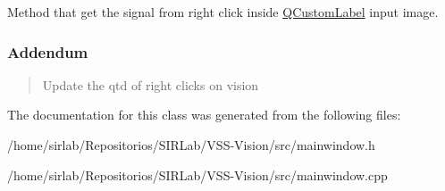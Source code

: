 Method that get the signal from right click inside \hyperlink{classQCustomLabel}{Q\-Custom\-Label} input image. 

\subsubsection*{Addendum }\begin{quotation}
Update the qtd of right clicks on vision \end{quotation}


The documentation for this class was generated from the following files\-:\begin{DoxyCompactItemize}
\item 
/home/sirlab/\-Repositorios/\-S\-I\-R\-Lab/\-V\-S\-S-\/\-Vision/src/mainwindow.\-h\item 
/home/sirlab/\-Repositorios/\-S\-I\-R\-Lab/\-V\-S\-S-\/\-Vision/src/mainwindow.\-cpp\end{DoxyCompactItemize}
